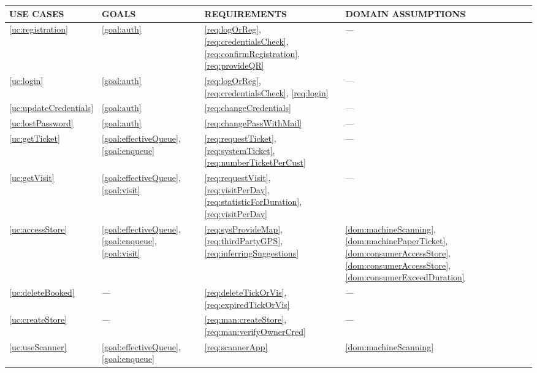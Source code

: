 \documentclass[a4paper, 12pt, oneside]{article}
\begin{document}
\begin{enumerate}[labelindent=20pt, label={UC.\arabic*}, itemindent=1em,leftmargin=!]
\begin{tabularx}{\linewidth}{| p{20mm} | p{20mm} | p{35mm} | p{50mm} |}

     \hline
    USE CASES & GOALS & REQUIREMENTS & DOMAIN ASSUMPTIONS \\
     \hline
    \ref{uc:registration} & \ref{goal:auth} & \ref{req:logOrReg}, \ref{req:credentialsCheck}, \ref{req:confirmRegistration}, \ref{req:provideQR}  & ---\\
    
     \hline
    \ref{uc:login} & \ref{goal:auth} & \ref{req:logOrReg}, \ref{req:credentialsCheck}, \ref{req:login} & --- \\
    
    \hline
    \ref{uc:updateCredentials} & \ref{goal:auth} & \ref{req:changeCredentials} & --- \\

    \hline
    \ref{uc:lostPassword} & \ref{goal:auth} & \ref{req:changePassWithMail} & --- \\
    
    \hline
    \ref{uc:getTicket} & \ref{goal:effectiveQueue}, \ref{goal:enqueue} & \ref{req:requestTicket}, \ref{req:systemTicket}, \ref{req:numberTicketPerCust} & --- \\
    \hline
    
    \ref{uc:getVisit} & \ref{goal:effectiveQueue}, \ref{goal:visit} & \ref{req:requestVisit}, \ref{req:visitPerDay}, \ref{req:statisticForDuration}, \ref{req:visitPerDay} & --- \\
    \hline
    
    \ref{uc:accessStore} & \ref{goal:effectiveQueue}, \ref{goal:enqueue}, \ref{goal:visit} & \ref{req:sysProvideMap}, \ref{req:thirdPartyGPS}, \ref{req:inferringSuggestions} & \ref{dom:machineScanning}, \ref{dom:machinePaperTicket}, \ref{dom:consumerAccessStore}, \ref{dom:consumerAccessStore}, \ref{dom:consumerExceedDuration} \\
    \hline
    
    \ref{uc:deleteBooked} & --- & \ref{req:deleteTickOrVis}, \ref{req:expiredTickOrVis} & --- \\
    \hline
    
    \ref{uc:createStore} & --- & \ref{req:man:createStore}, \ref{req:man:verifyOwnerCred} & --- \\
    \hline
    
    \ref{uc:useScanner} & \ref{goal:effectiveQueue}, \ref{goal:enqueue} & \ref{req:scannerApp} & \ref{dom:machineScanning}\\
    \hline
    

\end{tabularx}
\end{enumerate}
\end{document}
